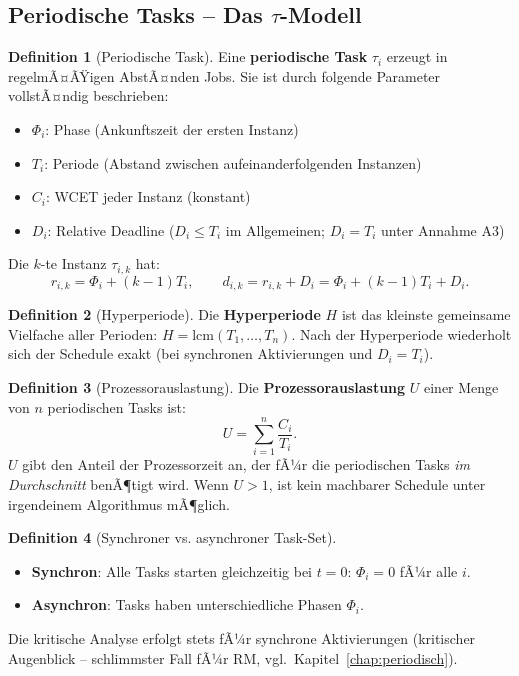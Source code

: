 ﻿\documentclass[a4paper,12pt]{report}
\theoremstyle{definition}
\newtheorem{definition}{Definition}[chapter]
\begin{document}
\subsection{Periodische Tasks -- Das $\tau$-Modell}

\begin{definition}[Periodische Task]
	Eine \textbf{periodische Task} $\tau_i$ erzeugt in regelmÃ¤ÃŸigen AbstÃ¤nden
	Jobs. Sie ist durch folgende Parameter vollstÃ¤ndig beschrieben:
	\begin{itemize}
		\item $\Phi_i$: Phase (Ankunftszeit der ersten Instanz)
		\item $T_i$: Periode (Abstand zwischen aufeinanderfolgenden Instanzen)
		\item $C_i$: WCET jeder Instanz (konstant)
		\item $D_i$: Relative Deadline ($D_i \leq T_i$ im Allgemeinen;
		      $D_i = T_i$ unter Annahme A3)
	\end{itemize}
	Die $k$-te Instanz $\tau_{i,k}$ hat:
	\[
		r_{i,k} = \Phi_i + (k-1)T_i, \qquad
		d_{i,k} = r_{i,k} + D_i = \Phi_i + (k-1)T_i + D_i.
	\]
\end{definition}

\begin{definition}[Hyperperiode]
	Die \textbf{Hyperperiode} $H$ ist das kleinste gemeinsame Vielfache aller
	Perioden: $H = \mathrm{lcm}(T_1, \ldots, T_n)$.
	Nach der Hyperperiode wiederholt sich der Schedule exakt (bei synchronen
	Aktivierungen und $D_i = T_i$).
\end{definition}

\begin{definition}[Prozessorauslastung]
	\label{def:util}
	Die \textbf{Prozessorauslastung} $U$ einer Menge von $n$ periodischen Tasks ist:
	\[
		U = \sum_{i=1}^{n} \frac{C_i}{T_i}.
	\]
	$U$ gibt den Anteil der Prozessorzeit an, der fÃ¼r die periodischen Tasks
	\emph{im Durchschnitt} benÃ¶tigt wird. Wenn $U > 1$, ist kein machbarer
	Schedule unter irgendeinem Algorithmus mÃ¶glich.
\end{definition}

\begin{definition}[Synchroner vs. asynchroner Task-Set]
	\begin{itemize}
		\item \textbf{Synchron}: Alle Tasks starten gleichzeitig bei $t=0$:
		      $\Phi_i = 0$ fÃ¼r alle $i$.
		\item \textbf{Asynchron}: Tasks haben unterschiedliche Phasen $\Phi_i$.
	\end{itemize}
	Die kritische Analyse erfolgt stets fÃ¼r synchrone Aktivierungen (kritischer
	Augenblick -- schlimmster Fall fÃ¼r RM, vgl.\ Kapitel~\ref{chap:periodisch}).
\end{definition}
\end{document}
